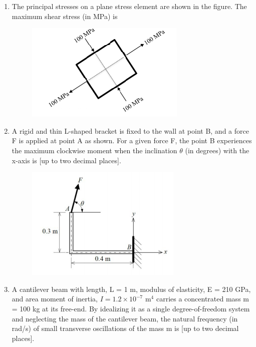 \documentclass[a4paper,10pt]{article}
\begin{document}
\begin{enumerate}
    \item The principal stresses on a plane stress element are shown in the figure. The maximum shear stress (in MPa) is
    \begin{figure}[H] \centering \includegraphics[width=0.4\columnwidth]{q5_solid.png} \caption*{} \label{fig:q5_solid} \end{figure}
    \hfill{}
    \begin{enumerate}[label=\Alph*)]
    \end{enumerate}

    \item A rigid and thin L-shaped bracket is fixed to the wall at point B, and a force F is applied at point A as shown. For a given force F, the point B experiences the maximum clockwise moment when the inclination $\theta$ (in degrees) with the x-axis is \underline{\hspace{2cm}} [up to two decimal places].
    \begin{figure}[H] \centering \includegraphics[width=0.5\columnwidth]{q6_solid.png} \caption*{} \label{fig:q6_solid} \end{figure}
    \hfill{}

    \item A cantilever beam with length, L = 1 m, modulus of elasticity, E = 210 GPa, and area moment of inertia, $I = 1.2 \times 10^{-7}$ m$^4$ carries a concentrated mass m = 100 kg at its free-end. By idealizing it as a single degree-of-freedom system and neglecting the mass of the cantilever beam, the natural frequency (in rad/s) of small transverse oscillations of the mass m is \underline{\hspace{2cm}} [up to two decimal places].
    \hfill{}


\end{enumerate}
\end{document}
